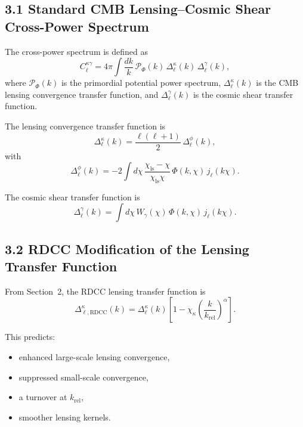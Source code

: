 \documentclass[11pt,a4paper]{article}
\begin{document}
\subsection*{3.1 Standard CMB Lensing--Cosmic Shear Cross-Power Spectrum}

The cross-power spectrum is defined as
\begin{equation}
    C_{\ell}^{\kappa\gamma}
    = 4\pi \int \frac{dk}{k}\,
      \mathcal{P}_{\Phi}(k)\,
      \Delta_{\ell}^{\kappa}(k)\,
      \Delta_{\ell}^{\gamma}(k),
\end{equation}
where $\mathcal{P}_{\Phi}(k)$ is the primordial potential power spectrum,
$\Delta_{\ell}^{\kappa}(k)$ is the CMB lensing convergence transfer function, and
$\Delta_{\ell}^{\gamma}(k)$ is the cosmic shear transfer function.

The lensing convergence transfer function is
\begin{equation}
    \Delta_{\ell}^{\kappa}(k)
    = \frac{\ell(\ell+1)}{2}\,
      \Delta_{\ell}^{\phi}(k),
\end{equation}
with
\begin{equation}
    \Delta_{\ell}^{\phi}(k)
    = -2 \int d\chi\,
      \frac{\chi_{\mathrm{ls}} - \chi}{\chi_{\mathrm{ls}}\chi}\,
      \Phi(k,\chi)\,
      j_{\ell}(k\chi).
\end{equation}

The cosmic shear transfer function is
\begin{equation}
    \Delta_{\ell}^{\gamma}(k)
    = \int d\chi\,
      W_{\gamma}(\chi)\,
      \Phi(k,\chi)\,
      j_{\ell}(k\chi).
\end{equation}

\subsection*{3.2 RDCC Modification of the Lensing Transfer Function}

From Section~2, the RDCC lensing transfer function is
\begin{equation}
    \Delta_{\ell,\mathrm{RDCC}}^{\kappa}(k)
    = \Delta_{\ell}^{\kappa}(k)
      \left[
        1 - \chi_{\kappa}
        \left(\frac{k}{k_{\mathrm{rel}}}\right)^{\alpha}
      \right].
\end{equation}

This predicts:

\begin{itemize}
    \item enhanced large-scale lensing convergence,
    \item suppressed small-scale convergence,
    \item a turnover at $k_{\mathrm{rel}}$,
    \item smoother lensing kernels.
\end{itemize}
\end{document}
